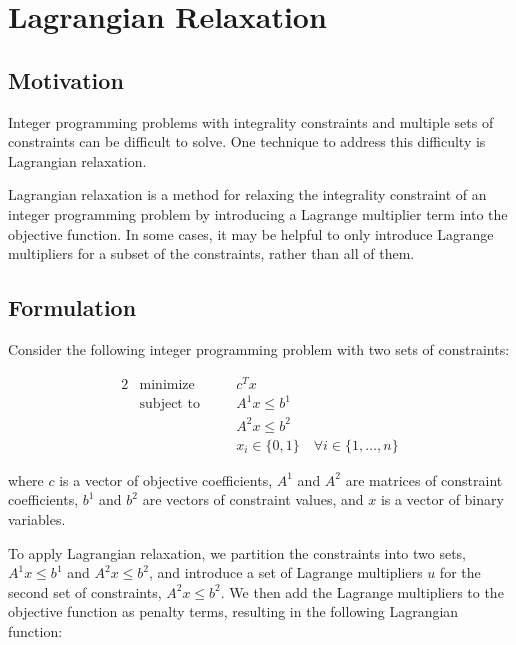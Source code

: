 





\section{Lagrangian Relaxation}
\subsection{Motivation}

Integer programming problems with integrality constraints and multiple sets of constraints can be difficult to solve. One technique to address this difficulty is Lagrangian relaxation. 

Lagrangian relaxation is a method for relaxing the integrality constraint of an integer programming problem by introducing a Lagrange multiplier term into the objective function. In some cases, it may be helpful to only introduce Lagrange multipliers for a subset of the constraints, rather than all of them.

\subsection{Formulation}

Consider the following integer programming problem with two sets of constraints:

\begin{alignat*}{2}
& \text{minimize} \quad && c^T x \\
& \text{subject to}       \quad && A^1 x \leq b^1 \\
&                          \quad && A^2 x \leq b^2 \\
&                          \quad && x_i \in \{0,1\} \quad \forall i \in \{1,\dots,n\}
\end{alignat*}

where $c$ is a vector of objective coefficients, $A^1$ and $A^2$ are matrices of constraint coefficients, $b^1$ and $b^2$ are vectors of constraint values, and $x$ is a vector of binary variables.

To apply Lagrangian relaxation, we partition the constraints into two sets, $A^1 x \leq b^1$ and $A^2 x \leq b^2$, and introduce a set of Lagrange multipliers $u$ for the second set of constraints, $A^2 x \leq b^2$. We then add the Lagrange multipliers to the objective function as penalty terms, resulting in the following Lagrangian function:

